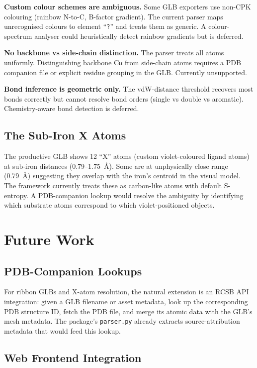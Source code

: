\documentclass[11pt,twocolumn,a4paper]{article}
\theoremstyle{definition}
\theoremstyle{remark}
\begin{document}
\textbf{Custom colour schemes are ambiguous.} Some GLB exporters use
non-CPK colouring (rainbow N-to-C, B-factor gradient). The current
parser maps unrecognised colours to element ``\texttt{?}'' and treats
them as generic. A colour-spectrum analyser could heuristically
detect rainbow gradients but is deferred.

\textbf{No backbone vs side-chain distinction.} The parser treats all
atoms uniformly. Distinguishing backbone Cα from side-chain atoms
requires a PDB companion file or explicit residue grouping in the GLB.
Currently unsupported.

\textbf{Bond inference is geometric only.} The vdW-distance threshold
recovers most bonds correctly but cannot resolve bond orders (single
vs double vs aromatic). Chemistry-aware bond detection is deferred.

\subsection{The Sub-Iron X Atoms}

The productive GLB shows 12 ``X'' atoms (custom violet-coloured ligand
atoms) at sub-iron distances (0.79--1.75~\AA). Some are at unphysically
close range (0.79~\AA) suggesting they overlap with the iron's centroid
in the visual model. The framework currently treats these as carbon-like
atoms with default S-entropy. A PDB-companion lookup would resolve the
ambiguity by identifying which substrate atoms correspond to which
violet-positioned objects.

\section{Future Work}
\label{sec:future}

\subsection{PDB-Companion Lookups}

For ribbon GLBs and X-atom resolution, the natural extension is an
RCSB API integration: given a GLB filename or asset metadata, look up
the corresponding PDB structure ID, fetch the PDB file, and merge its
atomic data with the GLB's mesh metadata. The package's \texttt{parser.py}
already extracts source-attribution metadata that would feed this
lookup.

\subsection{Web Frontend Integration}
\end{document}
